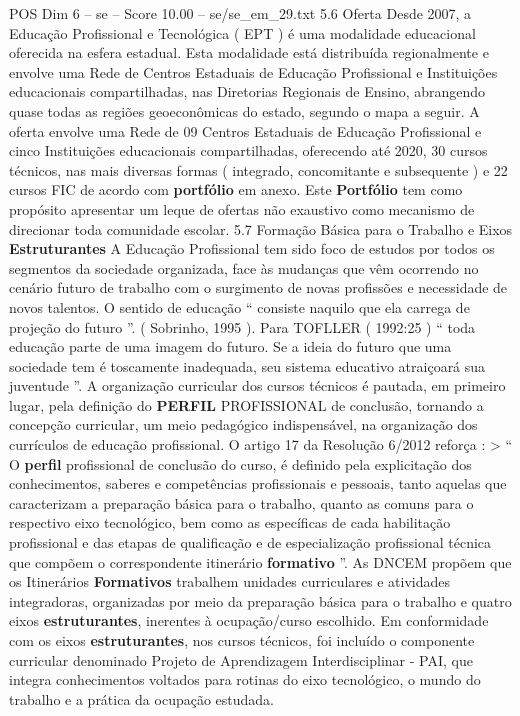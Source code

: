 \begin{textsample}{POS Dim 6 – se – Score 10.00 – se/se\_em\_29.txt}  \label{ex:f6_pos_042}
5.6 Oferta Desde 2007, a Educação Profissional e Tecnológica ( EPT ) é uma modalidade educacional oferecida na esfera estadual.
Esta modalidade está distribuída regionalmente e envolve uma Rede de Centros Estaduais de Educação Profissional e Instituições educacionais compartilhadas, nas Diretorias Regionais de Ensino, abrangendo quase todas as regiões geoeconômicas do estado, segundo o mapa a seguir.
A oferta envolve uma Rede de 09 Centros Estaduais de Educação Profissional e cinco Instituições educacionais compartilhadas, oferecendo até 2020, 30 cursos técnicos, nas mais diversas formas ( integrado, concomitante e subsequente ) e 22 cursos FIC de acordo com \textbf{portfólio} em anexo.
Este \textbf{Portfólio} tem como propósito apresentar um leque de ofertas não exaustivo como mecanismo de direcionar toda comunidade escolar. 5.7 Formação Básica para o Trabalho e Eixos \textbf{Estruturantes} A Educação Profissional tem sido foco de estudos por todos os segmentos da sociedade organizada, face às mudanças que vêm ocorrendo no cenário futuro de trabalho com o surgimento de novas profissões e necessidade de novos talentos.
O sentido de educação “ consiste naquilo que ela carrega de projeção do futuro ”. ( Sobrinho, 1995 ).
Para TOFLLER ( 1992:25 ) “ toda educação parte de uma imagem do futuro.
Se a ideia do futuro que uma sociedade tem é toscamente inadequada, seu sistema educativo atraiçoará sua juventude ”.
A organização curricular dos cursos técnicos é pautada, em primeiro lugar, pela definição do \textbf{PERFIL} PROFISSIONAL de conclusão, tornando a concepção curricular, um meio pedagógico indispensável, na organização dos currículos de educação profissional.
O artigo 17 da Resolução 6/2012 reforça : > “ O \textbf{perfil} profissional de conclusão do curso, é definido pela explicitação dos conhecimentos, saberes e competências profissionais e pessoais, tanto aquelas que caracterizam a preparação básica para o trabalho, quanto as comuns para o respectivo eixo tecnológico, bem como as específicas de cada habilitação profissional e das etapas de qualificação e de especialização profissional técnica que compõem o correspondente itinerário \textbf{formativo} ”.
As DNCEM propõem que os Itinerários \textbf{Formativos} trabalhem unidades curriculares e atividades integradoras, organizadas por meio da preparação básica para o trabalho e quatro eixos \textbf{estruturantes}, inerentes à ocupação/curso escolhido.
Em conformidade com os eixos \textbf{estruturantes}, nos cursos técnicos, foi incluído o componente curricular denominado Projeto de Aprendizagem Interdisciplinar - PAI, que integra conhecimentos voltados para rotinas do eixo tecnológico, o mundo do trabalho e a prática da ocupação estudada.

\end{textsample}

